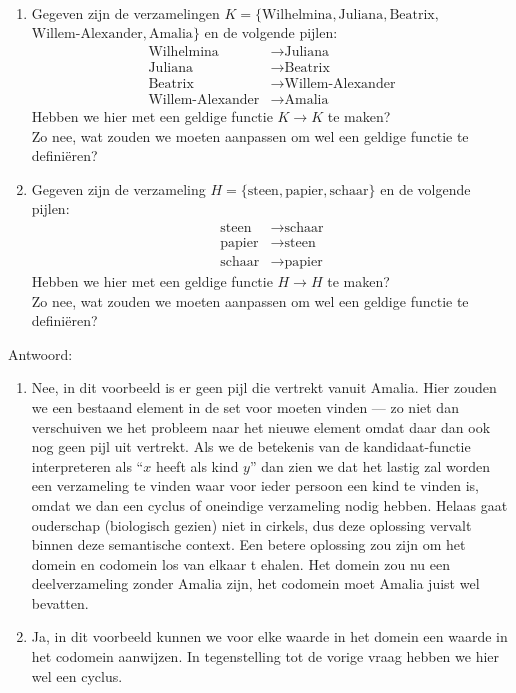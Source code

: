 \begin{answer}\mbox{}\\
  \begin{enumerate}[label=\textbf{\alph*.}]
    \item Gegeven zijn de verzamelingen $K = \{ \text{Wilhelmina}, \text{Juliana}, \text{Beatrix},$\\ $\text{Willem-Alexander}, \text{Amalia} \}$ en de volgende pijlen:
  \begin{align*}
    \text{Wilhelmina} &\longrightarrow \text{Juliana}\\
    \text{Juliana} &\longrightarrow \text{Beatrix}\\
    \text{Beatrix} &\longrightarrow \text{Willem-Alexander}\\
    \text{Willem-Alexander} &\longrightarrow \text{Amalia}
  \end{align*} Hebben we hier met een geldige functie $K \to K$ te maken?\\ Zo nee, wat zouden we moeten aanpassen om wel een geldige functie te defini\"{e}ren?\\

  \item Gegeven zijn de verzameling $H = \{ \text{steen}, \text{papier}, \text{schaar} \}$ en de volgende pijlen:
  \begin{align*}
    \text{steen} &\longrightarrow \text{schaar}\\
    \text{papier} &\longrightarrow \text{steen}\\
    \text{schaar} &\longrightarrow \text{papier}
  \end{align*} Hebben we hier met een geldige functie $H \to H$ te maken?\\ Zo nee, wat zouden we moeten aanpassen om wel een geldige functie te defini\"{e}ren?
  \end{enumerate}
  Antwoord:
  \begin{enumerate}[label=\textbf{\alph*.}]
    \item Nee, in dit voorbeeld is er geen pijl die vertrekt vanuit Amalia. Hier zouden we een bestaand element in de set voor moeten vinden --- zo niet dan verschuiven we het probleem naar het nieuwe element omdat daar dan ook nog geen pijl uit vertrekt.
    Als we de betekenis van de kandidaat-functie interpreteren als \enquote{$x$ heeft als kind $y$} dan zien we dat het lastig zal worden een verzameling te vinden waar voor ieder persoon een kind te vinden is, omdat we dan een cyclus of oneindige verzameling nodig hebben. Helaas gaat ouderschap (biologisch gezien) niet in cirkels, dus deze oplossing vervalt binnen deze semantische context. Een betere oplossing zou zijn om het domein en codomein los van elkaar t ehalen. Het domein zou nu een deelverzameling zonder Amalia zijn, het codomein moet Amalia juist wel bevatten.
    \item Ja, in dit voorbeeld kunnen we voor elke waarde in het domein een waarde in het codomein aanwijzen. In tegenstelling tot de vorige vraag hebben we hier wel een cyclus.
  \end{enumerate}

\end{answer}

